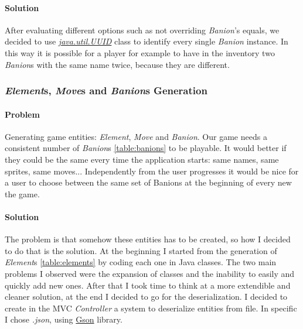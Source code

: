 \documentclass[12pt, a4paper]{report}
\begin{document}
            \paragraph{Solution}

            After evaluating different options such as not overriding \emph{Banion}'s equals, we decided to use
            \href{https://docs.oracle.com/en/java/javase/17/docs/api/java.base/java/util/UUID.html}{\textit{java.util.UUID}} class to identify every single \emph{Banion} instance.
            In this way it is possible for a player for example to have in the inventory two \emph{Banion}s with the same name twice, because they are different.

        \pagebreak

        \subsubsection{\emph{Element}s, \emph{Move}s and \emph{Banion}s Generation}

            \paragraph{Problem}
            
            Generating game entities: \emph{Element}, \emph{Move} and \emph{Banion}. Our game needs a consistent number of \emph{Banion}s \ref{table:banions} to be playable.
            It would better if they could be the same every time the application starts: same names, same sprites, same moves...
            Independently from the user progresses it would be nice for a user to choose between the same set of Banions at the beginning of every new the game.

            \paragraph{Solution}

            The problem is that somehow these entities has to be created, so how I decided to do that is the solution.
            At the beginning I started from the generation of \emph{Element}s \ref{table:elements} by coding each one in Java classes.
            The two main problems I observed were the expansion of classes and the inability to easily and quickly add new ones.
            After that I took time to think at a more extendible and cleaner solution, at the end I decided to go for the deserialization.
            I decided to create in the MVC \emph{Controller} a system to deserialize entities from file.
            In specific I chose \textit{.json}, using \href{https://github.com/google/gson}{Gson} library.
            
\end{document}
